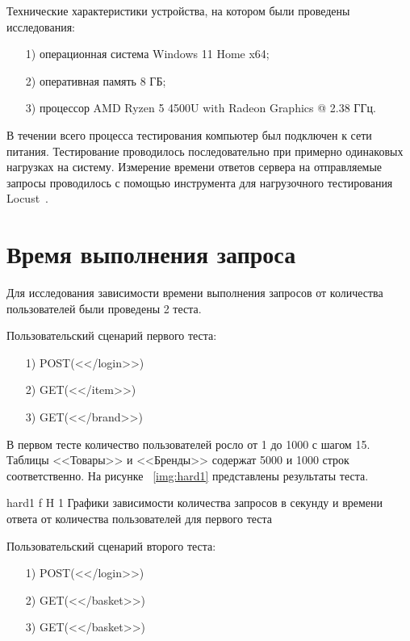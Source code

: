 \documentclass{bmstu}
\begin{document}
Технические характеристики устройства, на котором были проведены исследования:

\begin{enumerate}
\item[1)]
операционная система Windows 11 Home x64;
\item[2)]
оперативная память 8 ГБ;
\item[3)]
процессор AMD Ryzen 5 4500U with Radeon Graphics @ 2.38 ГГц.
\end{enumerate}

В течении всего процесса тестирования компьютер был подключен к сети питания. Тестирование проводилось последовательно при примерно одинаковых нагрузках на систему. Измерение времени ответов сервера на отправляемые запросы проводилось с помощью инструмента для нагрузочного тестирования Locust~\cite{Locust}.

\section{Время выполнения запроса}

Для исследования зависимости времени выполнения запросов от количества пользователей были проведены 2 теста.

Пользовательский сценарий первого теста:

\begin{enumerate}
	\item[1)]
	POST(<</login>>)
	\item[2)]
	GET(<</item>>)
	\item[3)]
	GET(<</brand>>)
\end{enumerate}

В первом тесте количество пользователей росло от 1 до 1000 с шагом 15. Таблицы <<Товары>> и <<Бренды>> содержат 5000 и 1000 строк соответственно. На рисунке ~\ref{img:hard1} представлены результаты теста.

{hard1}
{f}
{H}
{1\textwidth}
{Графики зависимости количества запросов в секунду и времени ответа от количества пользователей для первого теста}

Пользовательский сценарий второго теста:

\begin{enumerate}
	\item[1)]
	POST(<</login>>)
	\item[2)]
	GET(<</basket>>)
	\item[3)]
	GET(<</basket>>)
\end{enumerate}
\end{document}
